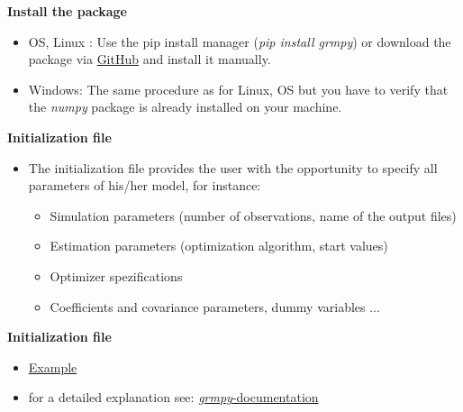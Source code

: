 \begin{frame}
\textbf{Install the package}

\medskip
\begin{itemize}\setlength\itemsep{1em}
\item OS, Linux : Use the pip install manager (\textit{pip install grmpy}) or download the package via \href{https://github.com/grmToolbox/grmpy}{GitHub} and install it manually.
\item Windows:  The same procedure as for Linux, OS but you have to verify that the \textit{numpy} package is already installed on your machine.
\end{itemize}
\end{frame}

\begin{frame}
\textbf{Initialization file}

\medskip
\begin{itemize}\setlength\itemsep{1em}
\item The initialization file provides the user with the opportunity to specify all parameters of his/her model, for instance:\medskip
  \begin{itemize}\setlength\itemsep{1em}
  \item Simulation parameters (number of observations, name of the output files)
  \item Estimation parameters (optimization algorithm, start values)
  \item Optimizer spezifications
  \item Coefficients and covariance parameters, dummy variables ...
  \end{itemize}
\end{itemize}
\end{frame}

\begin{frame}
\textbf{Initialization file}

\medskip
\begin{itemize}
\item \href{examples/tutorial.grmpy.ini}{Example}
\item for a detailed explanation see: \href{http://grmpy.readthedocs.io/en/latest/tutorial.html}{\textit{grmpy}-documentation}
\end{itemize}
\vfill
\end{frame}

